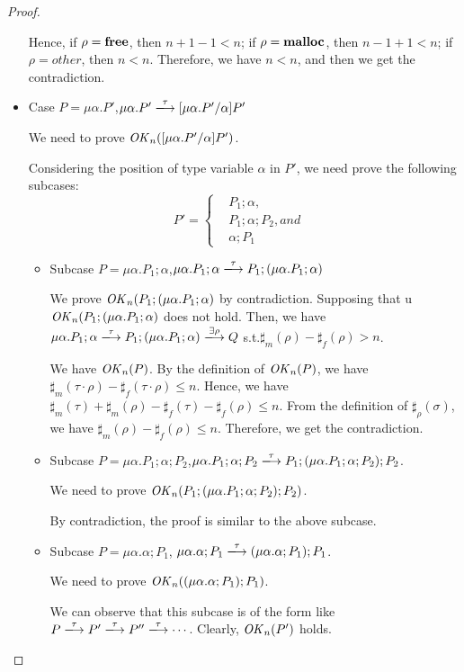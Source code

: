 \begin{proof}
\begin{itemize}
   Hence, if \(\rho = \mathbf{free}\), then \(n + 1 - 1 < n\); if \(\rho =
   \mathbf{malloc}\), then \( n - 1 + 1 < n \); if \( \rho = other\), then \(
   n < n \). Therefore, we have \(n < n\), and then we get the
   contradiction.

 \item Case  \(P = \mu\alpha.P'\),\Rtab  \( \mu\alpha.P' \xlongrightarrow{\tau} [\mu\alpha.P'\slash\alpha]P'\)

   We need to prove \(\mathit{OK}_n([\mu\alpha.P'\slash\alpha]P')\).

   Considering the position of type variable \(\alpha\) in \(P'\), we need prove the following subcases:
$$
   P'=\left\{
   \begin{aligned}
     &P_1;\alpha,& \\
     &P_1;\alpha;P_2, and&  \\
     &\alpha;P_1&
   \end{aligned}
   \right.
$$

   \begin{itemize}
   \item Subcase \(P = \mu\alpha.P_1;\alpha\),\Rtab \(
     \mu\alpha.P_1;\alpha \xlongrightarrow{\tau} P_1;(\mu\alpha.P_1;\alpha) \)
     
     We prove \(\mathit{OK}_n(P_1;(\mu\alpha.P_1;\alpha) \) by
     contradiction. Supposing that u\(\mathit{OK}_n(P_1;(\mu\alpha.P_1;\alpha)
     \) does not hold. Then, we have \( \mu\alpha.P_1;\alpha
     \xlongrightarrow{\tau} P_1;(\mu\alpha.P_1;\alpha)
     \xlongrightarrow{\exists \rho}Q\) s.t.\(\sharp_m(\rho) -
     \sharp_f(\rho) > n\).

     We have \(\mathit{OK}_n(P)\).  By the definition of \(\mathit{OK}_n(P)\), we
     have \(\sharp_m(\tau \cdot \rho) -\sharp_f(\tau \cdot \rho) \le
     n\). Hence, we have \(\sharp_m(\tau) + \sharp_m(\rho) -
     \sharp_f(\tau) -\sharp_f(\rho) \le n\).  From the definition of
     \(\sharp_\rho(\sigma)\), we have \(\sharp_m(\rho) -\sharp_f(\rho)
  \le n\). Therefore, we get the contradiction.

\item Subcase  \(P = \mu\alpha.P_1;\alpha;P_2\),\Rtab \(\mu\alpha.P_1;\alpha;P_2 \xlongrightarrow{\tau} P_1;(\mu\alpha.P_1;\alpha;P_2);P_2 \).

  We need to prove  \(\mathit{OK}_n(P_1;(\mu\alpha.P_1;\alpha;P_2);P_2) \).

  By contradiction, the proof is similar to the above subcase.

     \item Subcase \(P = \mu\alpha.\alpha;P_1\),\Rtab
       \(\mu\alpha.\alpha;P_1 \xlongrightarrow{\tau}
       (\mu\alpha.\alpha;P_1);P_1 \).

       We need to prove \(\mathit{OK}_n((\mu\alpha.\alpha;P_1);P_1)\).

       We can observe that this subcase is of the form like
       \(P\xlongrightarrow{\tau}P'\xlongrightarrow{\tau}P''\xlongrightarrow{\tau}
       \cdots\). Clearly, \(\mathit{OK}_n(P')\) holds.

     \end{itemize}

\end{itemize}
\end{proof}

